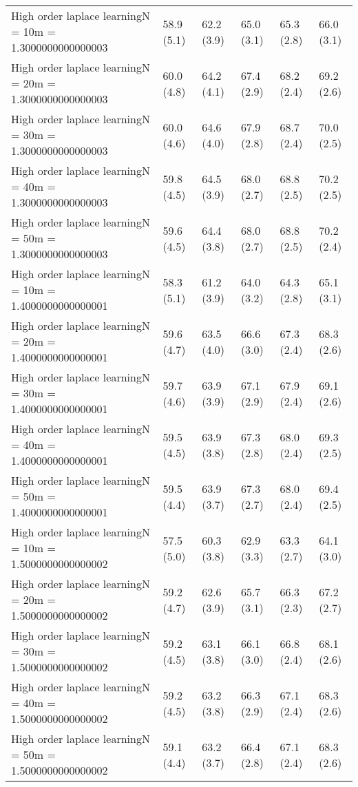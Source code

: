 \documentclass{article}
\begin{document}
\begin{table*}[t!]
\begin{center}
\begin{small}
\begin{sc}
\begin{tabular}{llllll}
High order laplace learningN = 10m = 1.3000000000000003&58.9 (5.1)      &62.2 (3.9)      &65.0 (3.1)      &65.3 (2.8)      &66.0 (3.1)      \\
High order laplace learningN = 20m = 1.3000000000000003&60.0 (4.8)      &64.2 (4.1)      &67.4 (2.9)      &68.2 (2.4)      &69.2 (2.6)      \\
High order laplace learningN = 30m = 1.3000000000000003&60.0 (4.6)      &64.6 (4.0)      &67.9 (2.8)      &68.7 (2.4)      &70.0 (2.5)      \\
High order laplace learningN = 40m = 1.3000000000000003&59.8 (4.5)      &64.5 (3.9)      &68.0 (2.7)      &68.8 (2.5)      &70.2 (2.5)      \\
High order laplace learningN = 50m = 1.3000000000000003&59.6 (4.5)      &64.4 (3.8)      &68.0 (2.7)      &68.8 (2.5)      &70.2 (2.4)      \\
High order laplace learningN = 10m = 1.4000000000000001&58.3 (5.1)      &61.2 (3.9)      &64.0 (3.2)      &64.3 (2.8)      &65.1 (3.1)      \\
High order laplace learningN = 20m = 1.4000000000000001&59.6 (4.7)      &63.5 (4.0)      &66.6 (3.0)      &67.3 (2.4)      &68.3 (2.6)      \\
High order laplace learningN = 30m = 1.4000000000000001&59.7 (4.6)      &63.9 (3.9)      &67.1 (2.9)      &67.9 (2.4)      &69.1 (2.6)      \\
High order laplace learningN = 40m = 1.4000000000000001&59.5 (4.5)      &63.9 (3.8)      &67.3 (2.8)      &68.0 (2.4)      &69.3 (2.5)      \\
High order laplace learningN = 50m = 1.4000000000000001&59.5 (4.4)      &63.9 (3.7)      &67.3 (2.7)      &68.0 (2.4)      &69.4 (2.5)      \\
High order laplace learningN = 10m = 1.5000000000000002&57.5 (5.0)      &60.3 (3.8)      &62.9 (3.3)      &63.3 (2.7)      &64.1 (3.0)      \\
High order laplace learningN = 20m = 1.5000000000000002&59.2 (4.7)      &62.6 (3.9)      &65.7 (3.1)      &66.3 (2.3)      &67.2 (2.7)      \\
High order laplace learningN = 30m = 1.5000000000000002&59.2 (4.5)      &63.1 (3.8)      &66.1 (3.0)      &66.8 (2.4)      &68.1 (2.6)      \\
High order laplace learningN = 40m = 1.5000000000000002&59.2 (4.5)      &63.2 (3.8)      &66.3 (2.9)      &67.1 (2.4)      &68.3 (2.6)      \\
High order laplace learningN = 50m = 1.5000000000000002&59.1 (4.4)      &63.2 (3.7)      &66.4 (2.8)      &67.1 (2.4)      &68.3 (2.6)      \\

\end{tabular}
\end{sc}
\end{small}
\end{center}
\end{table*}
\end{document}
